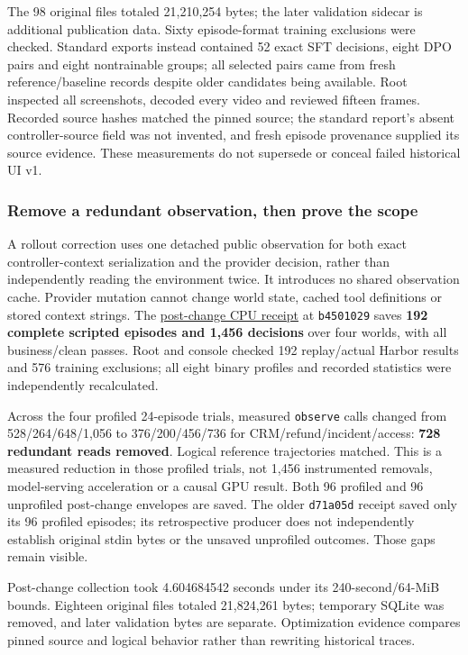 \documentclass[
  11pt,
  letterpaper,
]{article}
\begin{document}
The 98 original files totaled 21,210,254 bytes; the later validation
sidecar is additional publication data. Sixty episode-format training
exclusions were checked. Standard exports instead contained 52 exact SFT
decisions, eight DPO pairs and eight nontrainable groups; all selected
pairs came from fresh reference/baseline records despite older
candidates being available. Root inspected all screenshots, decoded
every video and reviewed fifteen frames. Recorded source hashes matched
the pinned source; the standard report's absent controller-source field
was not invented, and fresh episode provenance supplied its source
evidence. These measurements do not supersede or conceal failed
historical UI v1.

\subsubsection{Remove a redundant observation, then prove the
scope}\label{remove-a-redundant-observation-then-prove-the-scope}

A rollout correction uses one detached public observation for both exact
controller-context serialization and the provider decision, rather than
independently reading the environment twice. It introduces no shared
observation cache. Provider mutation cannot change world state, cached
tool definitions or stored context strings. The
\href{../../artifacts/profiling/20261010-v2/independent-validation.json}{post-change
CPU receipt} at \texttt{b4501029} saves \textbf{192 complete scripted
episodes and 1,456 decisions} over four worlds, with all business/clean
passes. Root and console checked 192 replay/actual Harbor results and
576 training exclusions; all eight binary profiles and recorded
statistics were independently recalculated.

Across the four profiled 24-episode trials, measured \texttt{observe}
calls changed from 528/264/648/1,056 to 376/200/456/736 for
CRM/refund/incident/access: \textbf{728 redundant reads removed}.
Logical reference trajectories matched. This is a measured reduction in
those profiled trials, not 1,456 instrumented removals, model-serving
acceleration or a causal GPU result. Both 96 profiled and 96 unprofiled
post-change envelopes are saved. The older \texttt{d71a05d} receipt
saved only its 96 profiled episodes; its retrospective producer does not
independently establish original stdin bytes or the unsaved unprofiled
outcomes. Those gaps remain visible.

Post-change collection took 4.604684542 seconds under its
240-second/64-MiB bounds. Eighteen original files totaled 21,824,261
bytes; temporary SQLite was removed, and later validation bytes are
separate. Optimization evidence compares pinned source and logical
behavior rather than rewriting historical traces.
\end{document}
